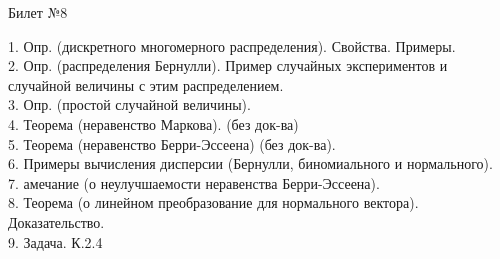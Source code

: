 \documentclass[preview]{standalone}
\begin{document}
 
\begin{center} {\Large Билет №8} \end{center} 

1.  Опр. (дискретного многомерного распределения). Свойства. Примеры.\\

2.  Опр. (распределения Бернулли).  Пример случайных экспериментов и случайной величины с этим распределением.\\

3.  Опр. (простой случайной величины).\\

4.  Теорема (неравенство Маркова). (без док-ва)\\

5.  Теорема (неравенство Берри-Эссеена) (без док-ва).\\

6.  Примеры вычисления дисперсии (Бернулли, биномиального и нормального).\\

7. амечание (о неулучшаемости неравенства Берри-Эссеена).\\

8.  Теорема (о линейном преобразование для нормального вектора). Доказательство.\\

9. Задача. К.2.4\\
\end{document}
